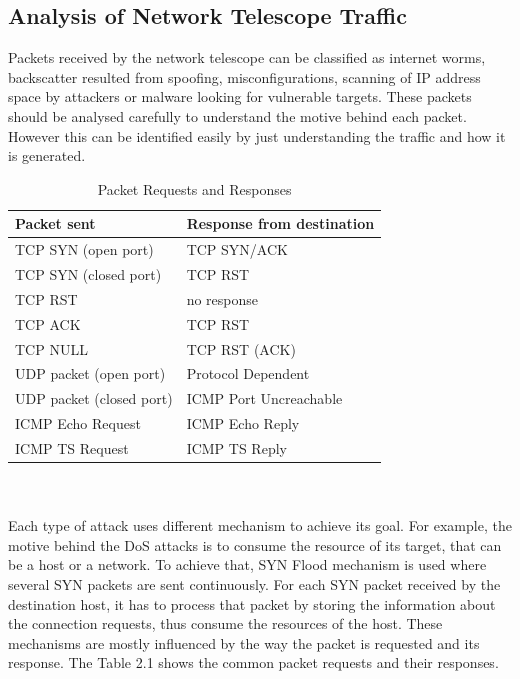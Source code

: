     \subsection{Analysis of Network Telescope Traffic}
    Packets received by the network telescope can be classified as internet worms, backscatter resulted from spoofing, misconfigurations, scanning of IP address space by attackers or malware looking for vulnerable targets.
    These packets should be analysed carefully to understand the motive behind each packet.
    However this can be identified easily by just understanding the traffic and how it is generated.
    \begin{table}[t!]
    \centering
    \begin{tabular}{ |p{6cm}|p{6cm}|  }
    \hline
    Packet sent & Response from destination\\
    \hline
    TCP SYN (open port)   & TCP SYN/ACK\\
    TCP SYN (closed port) & TCP RST\\
    TCP RST & no response\\
    TCP ACK    &  TCP RST\\
    TCP NULL & TCP RST (ACK)\\
    UDP packet (open port)& Protocol Dependent\\
    UDP packet (closed port)& ICMP Port Uncreachable\\
    ICMP Echo Request & ICMP Echo Reply\\
    ICMP TS Request & ICMP TS Reply\\
    \hline
    \end{tabular}
    \caption{Packet Requests and Responses \cite{moore2006inferring}}
    \end{table}
    \\\\
    Each type of attack uses different mechanism to achieve its goal. 
    For example, the motive behind the DoS attacks is to consume the resource of its target, that can be a host or a network.
    To achieve that, SYN Flood mechanism is used where several SYN packets are sent continuously.
    For each SYN packet received by the destination host, it has to process that packet by storing the information about the connection requests, thus consume the resources of the host.
    These mechanisms are mostly influenced by the way the packet is requested and its response.
    The Table 2.1 shows the common packet requests and their responses.
